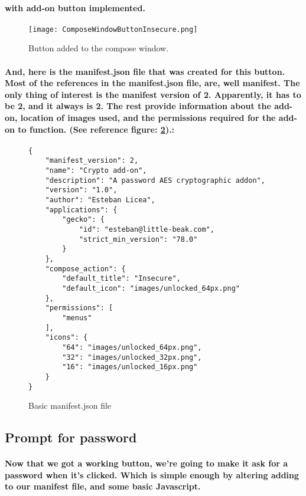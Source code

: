 \paragraph{with add-on button implemented.}

\begin{figure}[H]
    \centering
    \texttt{[image: ComposeWindowButtonInsecure.png]}
    \caption{\label{fig: withButton} Button added to the compose window.}
\end{figure}

\paragraph{And, here is the manifest.json file that was created for this button. Most of the references in the manifest.json file, are, well manifest. The only thing of interest is the manifest version of 2. Apparently, it has to be 2, and it always is 2. The rest provide information about the add-on, location of images used, and the permissions required for the add-on to function. (See reference figure: \ref{fig: basic_manifest.json}).:}

\begin{figure}[H]
\centering
\begin{verbatim}
{
    "manifest_version": 2,
    "name": "Crypto add-on",
    "description": "A password AES cryptographic addon",
    "version": "1.0",
    "author": "Esteban Licea",
    "applications": {
        "gecko": {
            "id": "esteban@little-beak.com",
            "strict_min_version": "78.0"
        }
    },
    "compose_action": {
        "default_title": "Insecure",
        "default_icon": "images/unlocked_64px.png"
    },
    "permissions": [
        "menus"
    ],
    "icons": {
        "64": "images/unlocked_64px.png",
        "32": "images/unlocked_32px.png",
        "16": "images/unlocked_16px.png"
    }
}
\end{verbatim}
\caption{\label{fig: basic_manifest.json} Basic manifest.json file}
\end{figure}


\subsection{Prompt for password}

\paragraph{Now that we got a working button, we're going to make it ask for a password when it's clicked. Which is simple enough by altering adding to our manifest file, and some basic Javascript. }

